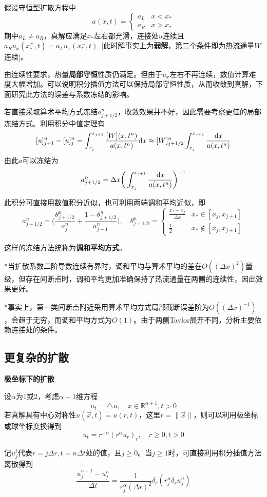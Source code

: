 \documentclass[a4paper,UTF8,fontset=windows]{ctexart}
\newcommand*{\dr}{\hspace{0.07em}\mathrm{d}}
\begin{document}
假设守恒型扩散方程中
$$a(x,t)=\begin{cases}a_L&x<x_*\\a_R&x>x_*\end{cases}$$
期中$a_L\ne a_R$，真解应满足$x_*$左右都光滑，连接处$u$连续且$a_Ru_x(x_*^+,t)=a_Lu_x(x_*^-,t)$\ [此时解事实上为\textbf{弱解}，第二个条件即为热流通量$W$连续]。

由连续性要求，热量\textbf{局部守恒}性质仍满足。但由于$u_x$左右不再连续，数值计算难度大幅增加。可以说明积分插值方法可以保持局部守恒性质，从而收敛到真解，下面研究此方法的误差与系数冻结的影响。

若直接采取算术平均方式冻结$a_{j+1/2}^n$，收敛效果并不好，因此需要考察更佳的局部冻结方式。利用积分中值定理有
$$[u]_{j+1}^n-[u]_j^n=\int_{x_j}^{x_{j+1}}\frac{[W](x,t^n)}{a(x,t^n)}\dr x\approx[W]_{j+1/2}^n\int_{x_j}^{x_{j+1}}\frac{\dr x}{a(x,t^n)}$$
由此$a$可以冻结为
$$a_{j+1/2}^n=\Delta x\bigg(\int_{x_j}^{x_{j+1}}\frac{\dr x}{a(x,t^n)}\bigg)^{-1}$$

此积分可直接用数值积分近似，也可利用两端调和平均近似，即
$$a_{j+1/2}^n=\bigg(\frac{\theta_{j+1/2}^n}{a_j^n}+\frac{1-\theta_{j+1/2}^n}{a_{j+1}^n}\bigg),\quad\theta_{j+1/2}^n=\begin{cases}\frac{x_*-x_j}{\Delta x}&x_*\in[x_j,x_{j+1}]\\\frac{1}{2}&x_*\notin[x_j,x_{j+1}]\end{cases}$$

这样的冻结方法统称为\textbf{调和平均方式}。

*当扩散系数二阶导数连续有界时，调和平均与算术平均的差在$O((\Delta x)^2)$量级，但存在间断点时，调和平均更加准确保持了热流通量在两侧的连续性，因此效果更好。

*事实上，第一类间断点附近采用算术平均方式局部截断误差阶为$O((\Delta x)^{-1})$，会趋于无穷，而调和平均方式为$O(1)$。由于两侧Taylor展开不同，分析主要依赖连接处的条件。

\subsection{更复杂的扩散}
\textbf{极坐标下的扩散}

设$\alpha$为1或2，考虑$\alpha+1$维方程
$$u_t=\triangle u,\quad x\in\mathbb{R}^{\alpha+1},t>0$$
若真解具有中心对称性$u(\vec{x},t)=u(r,t)$，这里$r=\|\vec{x}\|$，则可以利用极坐标或球坐标变换得到
$$u_t=r^{-\alpha}(r^\alpha u_r)_r,\quad r\ge0,t>0$$

记$u_j^t$代表$r=j\Delta r,t=n\Delta t$处的值，且$j\ge0$。当$j\ge1$时，可直接利用积分插值方法离散得到
$$\frac{u_j^{n+1}-u_j^n}{\Delta t}=\frac{1}{r_j^\alpha(\Delta r)^2}\delta_r(r_j^\alpha\delta_ru_j^n)$$
\end{document}
